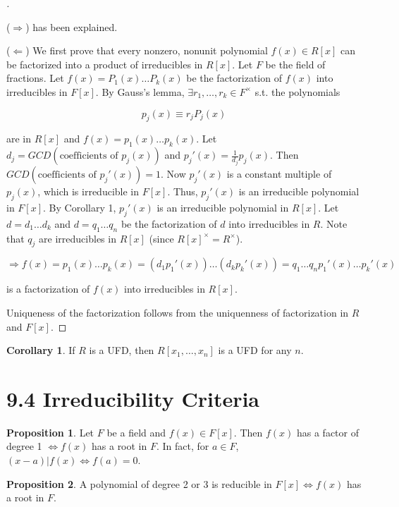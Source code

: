 \documentclass{article}
\theoremstyle{definition}
\newtheorem{cor}{Corollary}
\newtheorem{prop}{Proposition}
\newenvironment{proofs}[1][\proofname]{%
  \begin{proof}[#1]$ $\par\nobreak\ignorespaces
}{%
  \end{proof}
}
\begin{document}
\begin{proofs}
  ($\Rightarrow$) has been explained. 
  \par ($\Leftarrow$) We first prove that every nonzero, nonunit polynomial $f(x) \in R[x]$ can be factorized into a product of irreducibles in $R[x]$. Let $F$ be the field of fractions. Let $f(x) = P_1(x) \hdots P_k(x)$ be the factorization of $f(x)$ into irreducibles in $F[x]$. By Gauss's lemma, $\exists r_1, \hdots, r_k \in F^\times$ s.t. the polynomials 

  $$p_j(x) \equiv r_j P_j(x)$$

  are in $R[x]$ and $f(x) = p_1(x) \hdots p_k(x)$. Let $d_j = GCD(\text{coefficients of }p_j(x))$ and $p_j'(x) = \frac{1}{d_j} p_j(x)$. Then $GCD(\text{coefficients of }p_j'(x)) = 1$. Now $p_j'(x)$ is a constant multiple of $p_j(x)$, which is irreducible in $F[x]$. Thus, $p_j'(x)$ is an irreducible polynomial in $F[x]$. By Corollary 1, $p_j'(x)$ is an irreducible polynomial in $R[x]$. Let $d = d_1 \hdots d_k$ and $d = q_1 \hdots q_n$ be the factorization of $d$ into irreducibles in $R$. Note that $q_j$ are irreducibles in $R[x]$ (since $R[x]^\times = R^\times$). 

  $$\Rightarrow f(x) = p_1(x) \hdots p_k(x) = (d_1 p_1'(x)) \hdots (d_k p_k'(x)) = q_1 \hdots q_n p_1'(x) \hdots p_k'(x)$$

  is a factorization of $f(x)$ into irreducibles in $R[x]$. 

  \par Uniqueness of the factorization follows from the uniquenness of factorization in $R$ and $F[x]$. 
  
\end{proofs}

\begin{cor}
  If $R$ is a UFD, then $R[x_1, \hdots, x_n]$ is a UFD for any $n$.
\end{cor}

\section*{9.4 Irreducibility Criteria}

\begin{prop}
  Let $F$ be a field and $f(x) \in F[x]$. Then $f(x)$ has a factor of degree 1 $\Leftrightarrow f(x)$ has a root in $F$. In fact, for $a \in F$, $(x - a)|f(x) \Leftrightarrow f(a) = 0$.  
\end{prop}

\begin{prop}
  A polynomial of degree 2 or 3 is reducible in $F[x] \Leftrightarrow f(x)$ has a root in $F$.
\end{prop}
\end{document}
